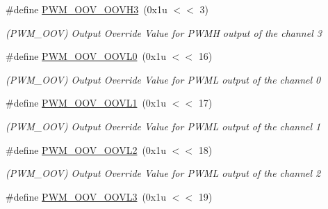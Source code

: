 \begin{DoxyCompactItemize}
\mbox{\label{group__SAMS70__PWM_ga074772692beb617e0cda4ac7cb69e214}} 
\#define \mbox{\hyperlink{group__SAMS70__PWM_ga074772692beb617e0cda4ac7cb69e214}{P\+W\+M\+\_\+\+O\+O\+V\+\_\+\+O\+O\+V\+H3}}~(0x1u $<$$<$ 3)
\begin{DoxyCompactList}\small\item\em (P\+W\+M\+\_\+\+O\+OV) Output Override Value for P\+W\+MH output of the channel 3 \end{DoxyCompactList}\item 
\mbox{\label{group__SAMS70__PWM_gaa28d79c8662129fb9f656199e0c77ff9}} 
\#define \mbox{\hyperlink{group__SAMS70__PWM_gaa28d79c8662129fb9f656199e0c77ff9}{P\+W\+M\+\_\+\+O\+O\+V\+\_\+\+O\+O\+V\+L0}}~(0x1u $<$$<$ 16)
\begin{DoxyCompactList}\small\item\em (P\+W\+M\+\_\+\+O\+OV) Output Override Value for P\+W\+ML output of the channel 0 \end{DoxyCompactList}\item 
\mbox{\label{group__SAMS70__PWM_ga7fde71f06f7907e95816dc62b79a48e6}} 
\#define \mbox{\hyperlink{group__SAMS70__PWM_ga7fde71f06f7907e95816dc62b79a48e6}{P\+W\+M\+\_\+\+O\+O\+V\+\_\+\+O\+O\+V\+L1}}~(0x1u $<$$<$ 17)
\begin{DoxyCompactList}\small\item\em (P\+W\+M\+\_\+\+O\+OV) Output Override Value for P\+W\+ML output of the channel 1 \end{DoxyCompactList}\item 
\mbox{\label{group__SAMS70__PWM_gae96833b545645028bb8085ee770f712b}} 
\#define \mbox{\hyperlink{group__SAMS70__PWM_gae96833b545645028bb8085ee770f712b}{P\+W\+M\+\_\+\+O\+O\+V\+\_\+\+O\+O\+V\+L2}}~(0x1u $<$$<$ 18)
\begin{DoxyCompactList}\small\item\em (P\+W\+M\+\_\+\+O\+OV) Output Override Value for P\+W\+ML output of the channel 2 \end{DoxyCompactList}\item 
\mbox{\label{group__SAMS70__PWM_ga0f9f80a389f9b126dddbe088c413c859}} 
\#define \mbox{\hyperlink{group__SAMS70__PWM_ga0f9f80a389f9b126dddbe088c413c859}{P\+W\+M\+\_\+\+O\+O\+V\+\_\+\+O\+O\+V\+L3}}~(0x1u $<$$<$ 19)
$$
\end{DoxyCompactItemize}
